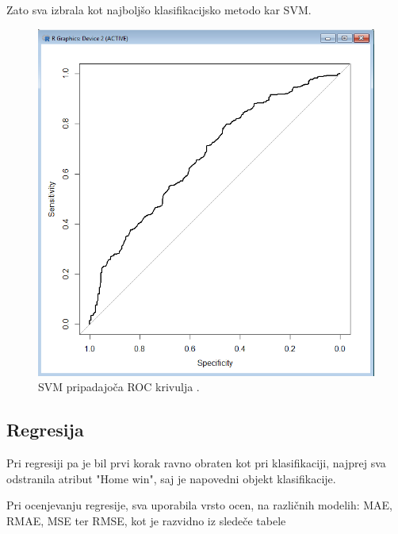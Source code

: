\documentclass[a4paper,11pt]{article}
\begin{document}
Zato sva izbrala kot najboljšo klasifikacijsko metodo kar SVM.

\begin{figure}[H]
\begin{center}
\includegraphics[scale=0.5]{9_SVM_roc.png}
\caption{SVM pripadajoča ROC krivulja .}
\label{slika4}
\end{center}
\end{figure} 


\subsection{Regresija}

Pri regresiji pa je bil prvi korak ravno obraten kot pri klasifikaciji, najprej
sva odstranila atribut "Home win", saj je napovedni objekt klasifikacije.

Pri ocenjevanju regresije, sva uporabila vrsto ocen, na različnih modelih: 
MAE, RMAE, MSE ter RMSE, kot je razvidno iz sledeče tabele
\end{document}
